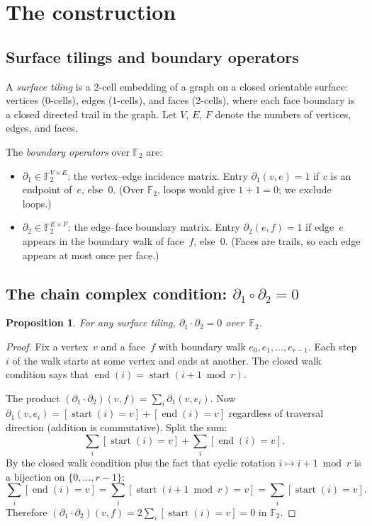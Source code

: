 \documentclass[11pt,a4paper]{article}
\newtheorem{proposition}[theorem]{Proposition}
\newcommand{\FF}{\mathbb{F}_2}
\begin{document}
\section{The construction}

\subsection{Surface tilings and boundary operators}

A \emph{surface tiling} is a 2-cell embedding of a graph on a closed
orientable surface: vertices (0-cells), edges (1-cells), and faces (2-cells),
where each face boundary is a closed directed trail in the graph. Let $V$,
$E$, $F$ denote the numbers of vertices, edges, and faces.

The \emph{boundary operators} over $\FF$ are:
\begin{itemize}[leftmargin=*]
\item $\partial_1 \in \FF^{V \times E}$: the vertex--edge incidence matrix.
  Entry $\partial_1(v,e) = 1$ if $v$ is an endpoint of~$e$, else~$0$.
  (Over $\FF$, loops would give $1 + 1 = 0$; we exclude loops.)
\item $\partial_2 \in \FF^{E \times F}$: the edge--face boundary matrix.
  Entry $\partial_2(e,f) = 1$ if edge~$e$ appears in the boundary walk of
  face~$f$, else~$0$. (Faces are trails, so each edge appears at most once
  per face.)
\end{itemize}

\subsection{The chain complex condition: $\partial_1 \circ \partial_2 = 0$}

\begin{proposition}\label{prop:d2}
For any surface tiling, $\partial_1 \cdot \partial_2 = 0$ over~$\FF$.
\end{proposition}

\begin{proof}
Fix a vertex~$v$ and a face~$f$ with boundary walk
$e_0, e_1, \ldots, e_{r-1}$. Each step $i$ of the walk starts at some vertex
and ends at another. The closed walk condition says that
$\operatorname{end}(i) = \operatorname{start}(i{+}1 \bmod r)$.

The product $(\partial_1 \cdot \partial_2)(v, f) = \sum_i \partial_1(v, e_i)$.
Now $\partial_1(v, e_i) = [\operatorname{start}(i) = v] +
[\operatorname{end}(i) = v]$ regardless of traversal direction (addition is
commutative). Split the sum:
\[
  \sum_i [\operatorname{start}(i) = v] + \sum_i [\operatorname{end}(i) = v].
\]
By the closed walk condition plus the fact that cyclic rotation
$i \mapsto i{+}1 \bmod r$ is a bijection on $\{0, \ldots, r{-}1\}$:
\[
  \sum_i [\operatorname{end}(i) = v]
  = \sum_i [\operatorname{start}(i{+}1 \bmod r) = v]
  = \sum_i [\operatorname{start}(i) = v].
\]
Therefore $(\partial_1 \cdot \partial_2)(v,f) = 2 \sum_i
[\operatorname{start}(i) = v] = 0$ in $\FF$.
\end{proof}
\end{document}
